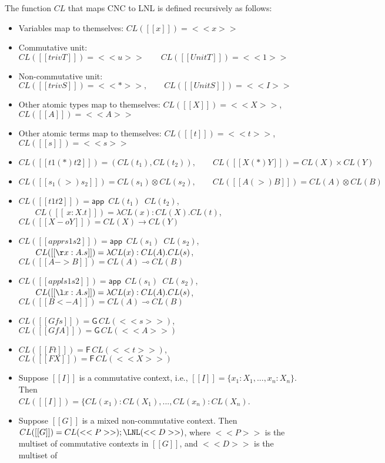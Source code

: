 \begin{definition}
  The function $CL$ that maps CNC to LNL is defined recursively as follows:
  \begin{itemize}
  \item Variables map to themselves: $CL([[x]]) = <<x>>$
  \item Commutative unit: $CL([[trivT]]) = <<u>> \qquad CL([[UnitT]]) = <<1>>$
  \item Non-commutative unit: $CL([[trivS]]) = <<*>>, \qquad CL([[UnitS]]) = <<I>>$
  \item Other atomic types map to themselves: $CL([[X]]) = <<X>>$,
        $CL([[A]]) = <<A>>$
  \item Other atomic terms map to themselves: $CL([[t]]) = <<t>>$,
        $CL([[s]]) = <<s>>$
  \item $CL([[t1 (*) t2]]) = (CL(t_1),CL(t_2)), \qquad CL([[X (*) Y]])=CL(X)\times CL(Y) $
  \item $CL([[s_1 (>) s_2]]) = CL(s_1)\otimes CL(s_2), \qquad CL([[A (>) B]])=CL(A)\otimes CL(B)$
  \item $CL([[t1 t2]]) = \mathsf{app}\,\,\,CL(t_1)\,\,\,CL(t_2)$,
        $\qquad CL([[\ x : X.t]]) = \lambda CL(x):CL(X).CL(t)$,\\
        $CL([[X -o Y]]) = CL(X) \rightarrow CL(Y)$
  \item $CL([[appr s1 s2]]) = \mathsf{app}\,\,\,CL(s_1)\,\,\,CL(s_2)$,
        $\qquad CL([[\r x : A.s]]) = \lambda CL(x):CL(A).CL(s)$,\\
        $CL([[A -> B]]) = CL(A) \multimap CL(B)$
  \item $CL([[appl s1 s2]]) = \mathsf{app}\,\,\,CL(s_1)\,\,\,CL(s_2)$,
        $\qquad CL([[\l x : A.s]]) = \lambda CL(x):CL(A).CL(s)$,\\
        $CL([[B <- A]]) = CL(A) \multimap CL(B)$
  \item $CL([[Gf s]]) = \mathsf{G}\,CL(<<s>>)$, \qquad $CL([[Gf A]]) = \mathsf{G}\,CL(<<A>>)$
  \item $CL([[F t]]) = \mathsf{F}\,CL(<<t>>)$, \qquad $CL([[F X]]) = \mathsf{F}\,CL(<<X>>)$
  \item Suppose $[[I]]$ is a commutative context, i.e.,
        $[[I]]=\{x_1:X_1,...,x_n:X_n\}$. Then \\
        $CL([[I]])=\{CL(x_1):CL(X_1),...,CL(x_n):CL(X_n)$.
  \item Suppose $[[G]]$ is a mixed non-commutative context. Then
        $CL([[G]])=CL(<<P>>);\LNL(<<D>>)$, where $<<P>>$ is the multiset of
        commutative contexts in $[[G]]$, and $<<D>>$ is the multiset of

\end{itemize}
\end{definition}
